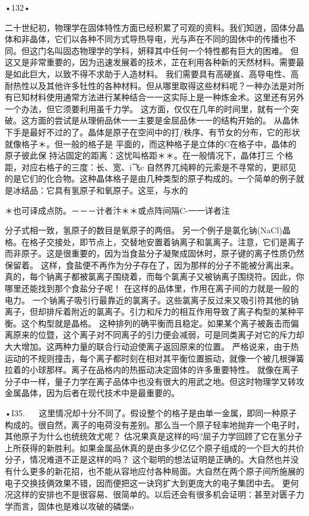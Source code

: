 •132•
  

二十世纪初，物理学在固体特性方面已经积累了可观的资料。我们知逍，固体分晶体和非晶体，它们以各种不同方式导热导电，光与声在不同的固休中的传播也不同。但这门名叫固态物理学的学科，妍释其中任何一个特性都有巨大的困难。
但这又是非常重要的，因为迅速发展着的技术，芷在利用各种新的天然材料。需要最是如此巨大，以致不得不求助于人造材料。
我们需要具有高硬峎、高导电性、高耐热性以及其他许多牡性的各种材料。但从哪里取得这些材料呢？一种办法是对所有已知材料使用通常方法进行某种结合一一这实际上是一种炼金术。这里还有另外一个办法，但它须要利用虽千力学。
这方面，仅仅在几年的时间里，就有一个突破。这方面的尝试是从理俯品休一一主要是金屈品休一一的结构开始的。
从晶休下手是最好不过的了。晶体是原子在空间中的打/秩序、有节女的分布，它的形状就像格子＊。但一般的格子是
平面的，而这种格子是立体的C在格子中，晶体的原子彼此保
持沾固定的距离：这忧叫格距＊＊。在一般情况下，晶体打三
个格距，对应右格子的三度：长、宽、i飞c
自然界兀纯粹的元索是不寻常的，更祁见的是它们的化合物。这种晶体格子是由几种类型的原子构成的。一个简单的例子就是冰结品：它具有氢原子和氧原子。这巠，与水的

＊也可译成点防。－－－计者汴＊＊或点阵间隔C-一一详者注

分子式相一致，氢原子的数目是氧原子的两倍。
另一个例子是氯化钠(NaCl)晶格。在格子交接处，即节点上，交替地安置着钠离子和氯离子。注意，它们是离子而非原子。这是很重要的，因为当食盐分子凝聚成固休时，原子键的离子性质仍然保留着。
这样，食盐便不再作为分子存在了，因为那样的分子不能被分离出来。真的，每个钠离子都被氯离子围绕着，而每个氯离子又被钠离子围绕符。因此，你哪里还能找到那个食盐分子呢！
在这样的品体里，作用在离子间的力就是一般的电力。
一个钠离子吸引行最靠近的氯离子。这些氯离子反过来又吸引符其他的钠离子，但却排斥着附近的氯离子。引力和斥力的相互作用导致了离子构型的某种平衡。这个构型就是晶格。
这种排列的确平衡而且稳定。如果某个离子被轰击而偏离原来的位暨，这个离子对不同离子的引力便会减弱，可是同类离子对它的斥力却大大增加。这两种力量的联合行动迫使离子返回原来的位置。
严格说来，由于热运动的不规则撞击，每个离子都时刻在相对其平衡位置振动，就像一个被几根弹簧拉着的小球那样。离子在品格内的热振动决定固体的许多重要特性。
就像在离子分子中一样，量子力学在离子品体中也没有很大的用武之地。但这时物理学又转攻金属晶体，因为后者在现代技术中是最重要的。

•I35.
  
这里情况却十分不同了。假设整个的格子是由单一金属，即同一种原子构成的。很自然，离子的电荷没有差别。那么当一个原子轻率地抛弃一个电子时，其他原子为什么也统统效尤呢？
估况果真是这样的吗?屈子力学回顾了它在氢分子上所获得的新胜利。如果金属品休真的是由多少亿亿个原子组成的一个巨大的共价分子，情况难道不正是这样的吗？
这个聪明的想法证明是正确的。大自然也并没有什么更多的新花招，也不能从容地应付各种局面。大自然在两个原子间所施展的电子交换技俩效果不错，因而便把这一诀窍扩大到更庞大的电子集团中去。
更何况这样的安排也不是很容易、很简单的。以后还会有很多机会证明：甚至对匮子力学而言，固体也是难以攻破的磷堡o


